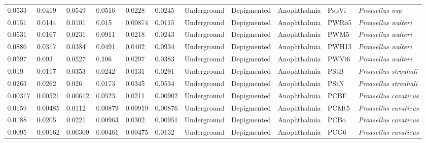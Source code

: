 \begin{tabular}{lllllllllll}
        0.0533 &              0.0419 &         0.0549 &         0.0516 &         0.0228 &         0.0245 &  Underground &  Depigmented &     Anophthalmia &    PspVi &                  \textit{Proasellus nsp} \\
        0.0151 &              0.0144 &         0.0101 &          0.015 &        0.00874 &         0.0115 &  Underground &  Depigmented &     Anophthalmia &    PWRo5 &              \textit{Proasellus walteri} \\
        0.0531 &              0.0167 &         0.0231 &         0.0911 &         0.0218 &         0.0243 &  Underground &  Depigmented &     Anophthalmia &     PWM5 &              \textit{Proasellus walteri} \\
        0.0886 &              0.0317 &         0.0384 &         0.0491 &         0.0402 &         0.0934 &  Underground &  Depigmented &     Anophthalmia &    PWH13 &              \textit{Proasellus walteri} \\
        0.0597 &               0.093 &         0.0527 &          0.106 &         0.0297 &         0.0383 &  Underground &  Depigmented &     Anophthalmia &    PWVi6 &              \textit{Proasellus walteri} \\
         0.019 &              0.0117 &         0.0353 &         0.0242 &         0.0131 &         0.0291 &  Underground &  Depigmented &     Anophthalmia &     PStB &            \textit{Proasellus strouhali} \\
        0.0263 &              0.0262 &          0.026 &         0.0173 &         0.0345 &         0.0534 &  Underground &  Depigmented &     Anophthalmia &     PStN &            \textit{Proasellus strouhali} \\
       0.00317 &             0.00521 &        0.00612 &         0.0523 &         0.0211 &        0.00902 &  Underground &  Depigmented &     Anophthalmia &     PCBF &            \textit{Proasellus cavaticus} \\
        0.0159 &             0.00485 &         0.0112 &        0.00879 &        0.00919 &        0.00876 &  Underground &  Depigmented &     Anophthalmia &    PCMt5 &            \textit{Proasellus cavaticus} \\
        0.0188 &              0.0205 &         0.0221 &        0.00963 &         0.0302 &        0.00951 &  Underground &  Depigmented &     Anophthalmia &     PCBo &            \textit{Proasellus cavaticus} \\
        0.0095 &             0.00162 &        0.00309 &        0.00461 &        0.00475 &         0.0132 &  Underground &  Depigmented &     Anophthalmia &     PCG6 &            \textit{Proasellus cavaticus} \\

\end{tabular}

